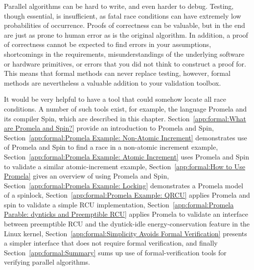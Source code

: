 


Parallel algorithms can be hard to write, and even harder to debug.
Testing, though essential, is insufficient, as fatal race conditions
can have extremely low probabilities of occurrence.
Proofs of correctness can be valuable, but in the end are just as
prone to human error as is the original algorithm.
In addition, a proof of correctness cannot be expected to find errors
in your assumptions, shortcomings in the requirements,
misunderstandings of the underlying software or hardware primitives,
or errors that you did not think to construct a proof for.
This means that formal methods can never replace testing, however,
formal methods are nevertheless a valuable addition to your validation toolbox.

It would be very helpful to have a tool that could somehow locate
all race conditions.
A number of such tools exist, for example,
the language Promela and its compiler Spin, which are described in
this chapter.
Section~\ref{app:formal:What are Promela and Spin?} provide an
introduction to Promela and Spin,
Section~\ref{app:formal:Promela Example: Non-Atomic Increment}
demonstrates use of Promela and Spin to find a race in a non-atomic increment
example,
Section~\ref{app:formal:Promela Example: Atomic Increment}
uses Promela and Spin to validate a similar atomic-increment example,
Section~\ref{app:formal:How to Use Promela}
gives an overview of using Promela and Spin,
Section~\ref{app:formal:Promela Example: Locking}
demonstrates a Promela model of a spinlock,
Section~\ref{app:formal:Promela Example: QRCU}
applies Promela and spin to validate a simple RCU implementation,
Section~\ref{app:formal:Promela Parable: dynticks and Preemptible RCU}
applies Promela to validate an interface between preemptible RCU and
the dyntick-idle energy-conservation feature in the Linux kernel,
Section~\ref{app:formal:Simplicity Avoids Formal Verification}
presents a simpler interface that does not require formal verification,
and finally
Section~\ref{app:formal:Summary}
sums up use of formal-verification tools for verifying parallel algorithms.




